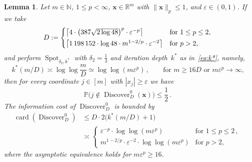 \documentclass[12pt]{article}
\theoremstyle{plain}
\newtheorem{lemma}[theorem]{Lemma}
\theoremstyle{definition}
\renewcommand{\P}{{\mathbb P}}
\DeclareMathOperator{\card}{card}
\newcommand{\eps}{\varepsilon}
\renewcommand{\vec}{\boldsymbol}
\newcommand{\R}{{\mathbb R}}
\newcommand{\N}{{\mathbb N}}
\DeclareMathOperator{\spot}{Spot}
\DeclareMathOperator{\discover}{Discover} %
\begin{document}
\begin{lemma} \label{lem:discover0}
    Let $m \in \N$, $1 \leq p < \infty$, $\vec{x} \in \R^m$ with $\|\vec{x}\|_p \leq 1$, and $\eps \in (0,1)$.
    If we take
    \begin{equation*}
        D := \begin{cases}
                \left\lceil 4 \cdot \left(387 \sqrt{2 \log 48}\right)^p \cdot \eps^{-p} \right\rceil
                    &\text{for } 1 \leq p \leq 2, \vspace{2pt}\\
                \left\lceil 1\,198\,152 \cdot \log 48 \cdot m^{1 - 2/p} \cdot \eps^{-2} \right\rceil
                    &\text{for } p > 2,
            \end{cases} 
    \end{equation*}
    and perform $\spot_{\delta_2,k^\ast}$ with $\delta_2 = \frac{1}{3}$
    and iteration depth~$k^\ast$ as in~\eqref{eq:k*}, namely,
    \begin{equation*}
        k^\ast(m/D) \asymp \log \log \frac{m}{D} \simeq \log \log (m \eps^p) \,,
        \qquad \text{for $m \geq 16 D$ or $m\eps^p \to \infty$,}
    \end{equation*}
    then for every 
    coordinate $j \in [m]$ with $|x_j| \geq \eps$ we have
    \begin{equation*}
        \P\bigl(j \notin \discover_D^0(\vec{x})\bigr) \leq \frac{1}{2} \,.
    \end{equation*}
    The information cost of $\discover_D^0$ is bounded by
    \begin{align*}
        \card(\discover^0_D)
            &\leq D \cdot 2\bigl(k^\ast(m/D) + 1\bigr) \\
            &\asymp \begin{cases}
                        \eps^{-p} \cdot \log \log (m \eps^p)
                            &\text{for } 1 \leq p \leq 2\,,\\
                        m^{1-2/p} \cdot \eps^{-2} \cdot \log \log (m \eps^p)
                            &\text{for } p > 2,
                    \end{cases}
    \end{align*}
    where the asymptotic equivalence holds for $m\eps^p \geq 16$.
\end{lemma}
\end{document}
